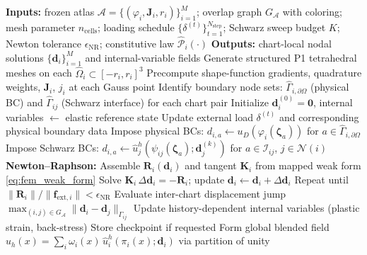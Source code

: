 \documentclass[sort&compress]{svjour3} %
\newcommand\StateX{\Statex\hspace{\algorithmicindent}}
\begin{document}
\begin{algorithm}[htbp]
\caption{Chart-local P1 FEM solver with multiplicative Schwarz coupling}
\label{alg:atlas_fem_schwarz}
\small
\begin{algorithmic}[1]
\Statex \textbf{Inputs:} frozen atlas $\mathcal{A}=\{(\varphi_i,\mathbf{J}_i,r_i)\}_{i=1}^M$; overlap graph $G_{\mathcal{A}}$ with coloring;
\StateX mesh parameter $n_{\mathrm{cells}}$; loading schedule $\{\delta^{(t)}\}_{t=1}^{N_{\mathrm{step}}}$; Schwarz sweep budget $K$;
\StateX Newton tolerance $\epsilon_{\mathrm{NR}}$; constitutive law $\widehat{\mathcal{P}}_i(\cdot)$
\Statex \textbf{Outputs:} chart-local nodal solutions $\{\mathbf{d}_i\}_{i=1}^M$ and internal-variable fields
\Statex
\State Generate structured P1 tetrahedral meshes on each $\widehat{\Omega}_i\subset[-r_i,r_i]^3$
\State Precompute shape-function gradients, quadrature weights, $\mathbf{J}_i$, $j_i$ at each Gauss point
\State Identify boundary node sets: $\widehat{\Gamma}_{i,\partial\Omega}$ (physical BC) and $\widehat{\Gamma}_{ij}$ (Schwarz interface) for each chart pair
\State Initialize $\mathbf{d}_i^{(0)}=\mathbf{0}$, internal variables $\leftarrow$ elastic reference state
 
    \State Update external load $\delta^{(t)}$ and corresponding physical boundary data
     
                \State Impose physical BCs: $d_{i,a}\leftarrow u_D(\varphi_i(\boldsymbol{\zeta}_a))$ for $a\in\widehat{\Gamma}_{i,\partial\Omega}$
                \State Impose Schwarz BCs: $d_{i,a}\leftarrow \widehat{u}_j^h(\psi_{ij}(\boldsymbol{\zeta}_a);\mathbf{d}_j^{(k)})$ for $a\in\mathcal{I}_{ij}$, $j\in\mathcal{N}(i)$
                \State \textbf{Newton--Raphson:}
                \Indent
                    \State Assemble $\mathbf{R}_i(\mathbf{d}_i)$ and tangent $\mathbf{K}_i$ from mapped weak form \eqref{eq:fem_weak_form}
                    \State Solve $\mathbf{K}_i\,\Delta\mathbf{d}_i=-\mathbf{R}_i$; update $\mathbf{d}_i\leftarrow\mathbf{d}_i+\Delta\mathbf{d}_i$
                    \State Repeat until $\|\mathbf{R}_i\|/\|\mathbf{f}_{\mathrm{ext},i}\|<\epsilon_{\mathrm{NR}}$
                \EndIndent
            \EndFor
        \EndFor
        \State Evaluate inter-chart displacement jump $\max_{(i,j)\in G_{\mathcal{A}}}\|\mathbf{d}_i-\mathbf{d}_j\|_{\Gamma_{ij}}$
    \EndFor
    \State Update history-dependent internal variables (plastic strain, back-stress)
    \State Store checkpoint if requested
\EndFor
\State Form global blended field $u_h(x)=\sum_i\omega_i(x)\,\widehat{u}_i^h(\pi_i(x);\mathbf{d}_i)$ via partition of unity
\end{algorithmic}
\end{algorithm}
\end{document}
